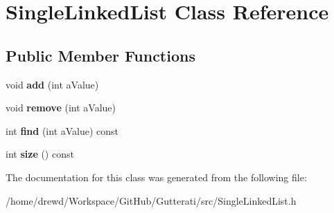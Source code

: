 \hypertarget{classSingleLinkedList}{}\section{Single\+Linked\+List Class Reference}
\label{classSingleLinkedList}
\subsection*{Public Member Functions}
\begin{DoxyCompactItemize}
\item 
\hypertarget{classSingleLinkedList_af784dd185e99887049e4fdf217cb2892}{}void {\bfseries add} (int a\+Value)\label{classSingleLinkedList_af784dd185e99887049e4fdf217cb2892}

\item 
\hypertarget{classSingleLinkedList_a32042e22dd322da5e67e58559faba5a7}{}void {\bfseries remove} (int a\+Value)\label{classSingleLinkedList_a32042e22dd322da5e67e58559faba5a7}

\item 
\hypertarget{classSingleLinkedList_ad3b63661c4131c1aec6a9be7334eefbb}{}int {\bfseries find} (int a\+Value) const \label{classSingleLinkedList_ad3b63661c4131c1aec6a9be7334eefbb}

\item 
\hypertarget{classSingleLinkedList_a1aaa7f81961b55fff996cffbfc8f92c9}{}int {\bfseries size} () const \label{classSingleLinkedList_a1aaa7f81961b55fff996cffbfc8f92c9}

\end{DoxyCompactItemize}


The documentation for this class was generated from the following file\+:\begin{DoxyCompactItemize}
\item 
/home/drewd/\+Workspace/\+Git\+Hub/\+Gutterati/src/Single\+Linked\+List.\+h\end{DoxyCompactItemize}
